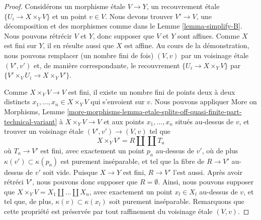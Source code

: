 \begin{proof}
Consid\'erons un morphisme \'etale $V \to Y$, un recouvrement \'etale $\{U_i \to X \times_Y V\}$ et
un point $v \in V$. Nous devons trouver $V' \to V$, une d\'ecomposition et des morphismes comme dans le
Lemme \ref{lemma-simplify-B}.
Nous pouvons r\'etr\'ecir $V$ et $Y$, donc supposer que $V$ et $Y$ sont affines.
Comme $X$ est fini sur $Y$, il en r\'esulte aussi que $X$ est affine.
Au cours de la d\'emonstration, nous pouvons remplacer (un nombre fini de fois) $(V, v)$ par un
voisinage \'etale $(V', v')$ et, de mani\`ere correspondante, le recouvrement
$\{U_i \to X \times_Y V\}$ par $\{V' \times_V U_i \to X \times_Y V'\}$.

\medskip\noindent
Comme $X \times_Y V \to V$ est fini, il existe un nombre fini de
points deux \`a deux distincts $x_1, \ldots, x_n \in X \times_Y V$
qui s'envoient sur $v$. Nous pouvons appliquer
More on Morphisms, Lemme
\ref{more-morphisms-lemma-etale-splits-off-quasi-finite-part-technical-variant}
\`a $X \times_Y V \to V$ et aux points $x_1, \ldots, x_n$ situ\'es au-dessus de
$v$, et trouver un voisinage \'etale $(V', v') \to (V, v)$
tel que
$$
X \times_Y V' = R \amalg \coprod T_a
$$
o\`u $T_a \to V'$ est fini, avec exactement un point $p_a$ au-dessus de $v'$,
o\`u de plus $\kappa(v') \subset \kappa(p_a)$ est purement ins\'eparable, et
tel que la fibre de $R \to V'$ au-dessus de $v'$ soit vide.
Puisque $X \to Y$ est fini, $R \to V'$ l'est aussi. Apr\`es avoir
r\'etr\'eci $V'$, nous pouvons donc supposer que $R = \emptyset$. Ainsi, nous pouvons
supposer que $X \times_Y V = X_1 \amalg \ldots \amalg X_n$, avec
exactement un point $x_l \in X_l$ au-dessus de $v$, et tel que, de plus,
$\kappa(v) \subset \kappa(x_l)$ soit purement ins\'eparable. Remarquons que cette
propri\'et\'e est pr\'eserv\'ee par tout raffinement du voisinage \'etale
$(V, v)$.


\end{proof}
